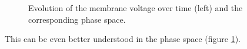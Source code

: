 \documentclass[12pt,a4paper]{article}
\begin{document}
\begin{figure}[H]
\hspace*{-0.5cm}

\caption{Evolution of the membrane voltage over time (left) and the corresponding phase space.}
\label{ppcompneur}
\end{figure}
This can be even better understood in the phase space (figure \ref{ppcompneur}).
\end{document}
